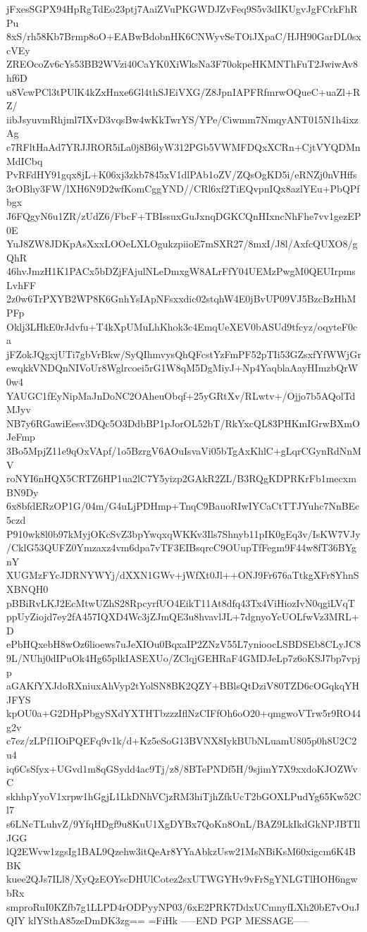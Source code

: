 jFxesSGPX94HpRgTdEo23ptj7AaiZVuPKGWDJZvFeq9S5v3dIKUgvJgFCrkFhRPu
8xS/rh58Kb7Brmp8oO+EABwBdobnHK6CNWyvSeTOiJXpaC/HJH90GarDL0sxcVEy
ZREOcoZv6cYs53BB2WVzi40CaYK0XiWksNa3F70okpeHKMNThFuT2JwiwAv8hf6D
u8VcwPCl3tPUlK4kZxHnxe6Gl4thSJEiVXG/Z8JpnIAPFRfmrwOQueC+uaZl+RZ/
iibJsyuvmRhjml7IXvD3vqsBw4wKkTwrYS/YPe/Ciwmm7NmqyANT015N1h4ixzAg
c7RFltHaAd7YRJJROR5iLa0j8B6lyW312PGb5VWMFDQxXCRn+CjtVYQDMnMdICbq
PvRFdHY91gqx8jL+K06xj3zkb7845xV1dlPAb1oZV/ZQsOgKD5i/eRNZj0nVHffs
3rOBhy3FW/lXH6N9D2wfKomCggYND//CRl6xf2TiEQvpnIQx8azlYEu+PbQPfbgx
J6FQgyN6u1ZR/zUdZ6/FbcF+TBIssuxGuJxnqDGKCQnHIxncNhFhe7vv1gezEP0E
YuJ8ZW8JDKpAsXxxLOOeLXLOgukzpiioE7mSXR27/8mxI/J8l/AxfcQUXO8/gQhR
46hvJmzH1K1PACx5bDZjFAjulNLeDmxgW8ALrFfY04UEMzPwgM0QEUIrpmsLvhFF
2z0w6TrPXYB2WP8K6GnhYsIApNFsxxdic02stqhW4E0jBvUP09VJ5BzcBzHhMPFp
Oklj3LHkE0rJdvfu+T4kXpUMuLhKhok3c4EmqUeXEV0bASUd9tfcyz/oqyteF0ca
jFZokJQgxjUTi7gbVrBkw/SyQIhmvysQhQFcstYzFmPF52pTIi53GZsxfYfWWjGr
ewqkkVNDQnNIVoUr8Wglrcoei5rG1W8qM5DgMiyJ+Np4YaqblaAayHImzbQrW0w4
YAUGC1fEyNipMaJnDoNC2OAheuObqf+25yGRtXv/RLwtv+/Ojjo7b5AQolTdMJyv
NB7y6RGawiEesv3DQc5O3DdbBP1pJorOL52bT/RkYxcQL83PHKmIGrwBXmOJeFmp
3Bo5MpjZ11e9qOxVApf/1o5BzrgV6AOuIsvaVi05bTgAxKhlC+gLqrCGynRdNnMV
roNYI6nHQX5CRTZ6HP1ua2lC7Y5yizp2GAkR2ZL/B3RQgKDPRKrFb1mecxmBN9Dy
6x8bfdERzOP1G/04m/G4uLjPDHmp+TnqC9BauoRIwIYCaCtTTJYuhc7NnBEc5czd
P910wk8l0b97kMyjOKcSvZ3bpYwqxqWKKv3Ils7Shnyb11pIK0gEq3v/IsKW7VJy
/CklG53QUFZ0Ymzaxz4vm6dpa7vTF3EIBsqrcC9OUupTfFegm9F44w8fT36BYgnY
XUGMzFYcJDRNYWYj/dXXN1GWv+jWfXt0Jl++ONJ9Fr676aTtkgXFr8YhnSXBNQH0
pBBiRvLKJ2EcMtwUZhS28RpcyrfUO4EikT11At8dfq43Tx4ViHiozIvN0qgiLVqT
ppUyZiojd7ey2fA457IQXD4Wc3jZJmQE3u8hvavlJL+7dgnyoYcUOLfwVz3MRL+D
ePbHQxebH8wOz6lioews7uJeXIOu0BqxaIP2ZNzV55L7ynioocLSBDSEb8CLyJC8
9L/NUhj0dIPuOk4Hg65plkIASEXUo/ZClqjGEHRaF4GMDJeLp7z6oKSJ7bp7vpjp
aGAKfYXJdoRXniuxAhVyp2tYolSN8BK2QZY+BBlsQtDziV80TZD6cOGqkqYHJFYS
kpOU0a+G2DHpPbgySXdYXTHTbzzzIflNzCIFfOh6oO20+qmgwoVTrw5r9RO44g2v
c7ez/zLPf1IOiPQEFq9v1k/d+Kz5eSoG13BVNX8IykBUbNLuamU805p0h8U2C2u4
iq6CsSfyx+UGvd1m8qGSydd4ac9Tj/z8/8BTePNDf5H/9sjimY7X9xxdoKJOZWvC
skhhpYyoV1xrpw1hGgjL1LkDNhVCjzRM3hiTjhZfkUcT2bGOXLPudYg65Kw52Cl7
s6LNcTLuhvZ/9YfqHDgf9u8KuU1XgDYBx7QoKn8OnL/BAZ9LkIkdGkNPJBTIlJGG
lQ2EWvw1zgsIg1BAL9Qzehw3itQeAr8YYaAbkzUsw21MsNBiKsM60xigcm6K4BBK
kuee2QJs7ILl8/XyQzEOYscDHUlCotez2sxUTWGYHv9vFrSgYNLGTlHOH6ngwbRx
smproRuI0KZfb7g1LLPD4rODPyyNP03/6xE2PRK7DdxUCmnyfLXh20bE7vOuJQIY
klYSthA85zeDmDK3zg==
=FiHk
-----END PGP MESSAGE-----
